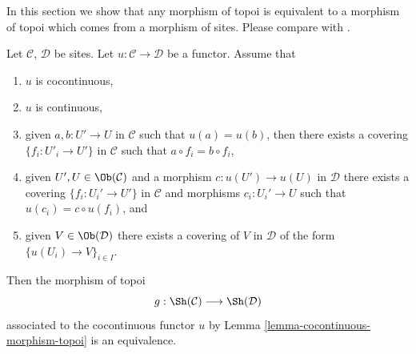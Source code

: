 \noindent
In this section we show that any morphism of topoi is equivalent
to a morphism of topoi which comes from a morphism of sites.
Please compare with \cite[Expos\'e III, Proposition 4.9.4]{SGA4}.

\begin{lemma}
\label{lemma-equivalence}
Let $\mathcal{C}$, $\mathcal{D}$ be sites.
Let $u : \mathcal{C} \to \mathcal{D}$ be a functor.
Assume that
\begin{enumerate}
\item $u$ is cocontinuous,
\item $u$ is continuous,
\item given $a, b : U' \to U$ in $\mathcal{C}$ such that
$u(a) = u(b)$, then there exists a covering $\{f_i : U'_i \to U'\}$
in $\mathcal{C}$ such that $a \circ f_i = b \circ f_i$,
\item given $U', U \in \Ob(\mathcal{C})$ and
a morphism $c : u(U') \to u(U)$ in $\mathcal{D}$ there exists
a covering $\{f_i : U_i' \to U'\}$ in $\mathcal{C}$
and morphisms $c_i : U_i' \to U$ such that $u(c_i) = c \circ u(f_i)$, and
\item given $V \in \Ob(\mathcal{D})$ there exists a covering
of $V$ in $\mathcal{D}$ of the form $\{u(U_i) \to V\}_{i \in I}$.
\end{enumerate}
Then the morphism of topoi
$$
g : \Sh(\mathcal{C}) \longrightarrow \Sh(\mathcal{D})
$$
associated to the cocontinuous functor $u$ by
Lemma \ref{lemma-cocontinuous-morphism-topoi}
is an equivalence.
\end{lemma}

